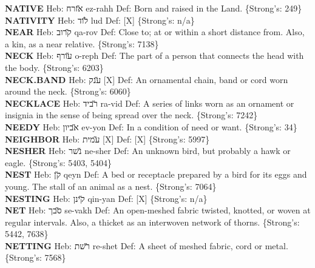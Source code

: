 {\textbf{NATIVE} Heb: {\large\H אזרח} ez-rahh Def: Born and raised in the Land. \{Strong's: 249\}\hfill{}\\

\textbf{NATIVITY} Heb: {\large\H לוד} lud Def: {[}X{]} \{Strong's: n/a\}\hfill{}\\

\textbf{NEAR} Heb: {\large\H קרוב} qa-rov Def: Close to; at or within a short distance from. Also, a kin, as a near relative. \{Strong's: 7138\}\hfill{}\\

\textbf{NECK} Heb: {\large\H עורף} o-reph Def: The part of a person that connects the head with the body. \{Strong's: 6203\}\hfill{}\\

\textbf{NECK.BAND} Heb: {\large\H ענק} {[}X{]} Def: An ornamental chain, band or cord worn around the neck. \{Strong's: 6060\}\hfill{}\\

\textbf{NECKLACE} Heb: {\large\H רביד} ra-vid Def: A series of links worn as an ornament or insignia in the sense of being spread over the neck. \{Strong's: 7242\}\hfill{}\\

\textbf{NEEDY} Heb: {\large\H אביון} ev-yon Def: In a condition of need or want. \{Strong's: 34\}\hfill{}\\

\textbf{NEIGHBOR} Heb: {\large\H עמית} {[}X{]} Def: {[}X{]} \{Strong's: 5997\}\hfill{}\\

\textbf{NESHER} Heb: {\large\H נשר} ne-sher Def: An unknown bird, but probably a hawk or eagle. \{Strong's: 5403, 5404\}\hfill{}\\

\textbf{NEST} Heb: {\large\H קן} qeyn Def: A bed or receptacle prepared by a bird for its eggs and young. The stall of an animal as a nest. \{Strong's: 7064\}\hfill{}\\

\textbf{NESTING} Heb: {\large\H קינן} qin-yan Def: {[}X{]} \{Strong's: n/a\}\hfill{}\\

\textbf{NET} Heb: {\large\H סבך} se-vakh Def: An open-meshed fabric twisted, knotted, or woven at regular intervals. Also, a thicket as an interwoven network of thorns. \{Strong's: 5442, 7638\}\hfill{}\\

\textbf{NETTING} Heb: {\large\H רשת} re-shet Def: A sheet of meshed fabric, cord or metal. \{Strong's: 7568\}\hfill{}\\

}
